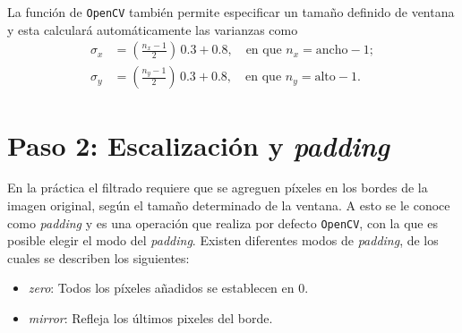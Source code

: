 La función de \texttt{\small OpenCV} también permite especificar un tamaño definido de ventana y esta calculará automáticamente las varianzas como
%
\begin{subequations}
    \label{eq:variance_from_kernel}
    \begin{align}
        \sigma_x &= \left(\frac{n_x - 1}{2}\right)\,0.3 + 0.8, \quad \text{en que } n_x = \text{ancho} - 1; \label{eq:variance_from_kernel_1} \\
        \sigma_y &= \left(\frac{n_y - 1}{2}\right)\,0.3 + 0.8, \quad \text{en que } n_y = \text{alto} - 1. \label{eq:variance_from_kernel_2}
    \end{align}
\end{subequations}

\section*{Paso 2: Escalización y \emph{padding}}
\label{sec:padding}
En la práctica el filtrado requiere que se agreguen píxeles en los bordes de la imagen original, según el tamaño determinado de la ventana.
A esto se le conoce como \emph{padding} y es una operación que realiza por defecto \texttt{\small OpenCV}, con la que es posible elegir el modo del \emph{padding}.
Existen diferentes modos de \emph{padding}, de los cuales se describen los siguientes:
%
\begin{itemize}
    \item \emph{zero}: Todos los píxeles añadidos se establecen en $0$.
    \item \emph{mirror}: Refleja los últimos pixeles del borde.
\end{itemize}

